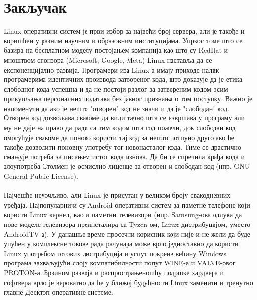 \documentclass[a4paper,14pt]{article}
\begin{document}
\section*{Закључак}
Linux оперативни систем је први избор за највећи број сервера, али је такође и коришћен у разним научним и образовним институцијама. Упркос томе што се базира на бесплатном моделу постојањем компанија као што су RedHat и мноштвом спонзора (Microsoft, Google, Meta) Linux наставља да се експоненцијално развија. Програмери иза Linux-а имају приходе налик програмерима идентичних производа затвореног кода, што доказује да је етика слободног кода успешна и да не постоји разлог за затвореним кодом осим прикупљања персоналних података без јавног признања о том поступку. Важно је напоменути да ако је нешто "отворен" код не значи и да је "слободан" код. Отворен код дозвољава свакоме да види тачно шта се извршава у програму али му не даје на право да ради са тим кодом шта год пожели, док слободан код омогућује свакоме да поново користи тај код за нешто потпуно друго ако ће такође дозволити поновну употребу тог новонасталог кода. Тиме се драстично смањује потреба за писањем истог кода изнова. Да би се спречила крађа кода и злоупотреба Столмен је осмислио лиценце за отворен и слободан код (нпр. GNU General Public License\cite{gpl}).
\\\\
Најчешће неуочљиво, али Linux је присутан у великом броју свакодневних уређаја. Најпопуларнији су Android оперативни систем за паметне телефоне који користи Linux кернел, као и паметни телевизори (нпр. Samsung-ова одлука да нове моделе телевизора преинсталира са Tyzen-ом, Linux дистрибуцијом, уместо AndroidTV-а). У данашње време просечни корисник који није и не жели да буде упућен у комплексне токове рада рачунара може врло једноставно да користи Linux употребом готових дистрибуција и успут покрене већину Windows програма захваљујући слоју компатибилности попут WINE-а\cite{wine} и VALVE-овог\cite{valve} PROTON-а\cite{proton}. Брзином развоја и распрострањеношћу подршке хардвера и софтвера врло је вероватно да ће у ближој будућности Linux заменити и тренутно главне Десктоп оперативне системе.
\newpage

\renewcommand\refname{Литература}


\newpage
\end{document}
